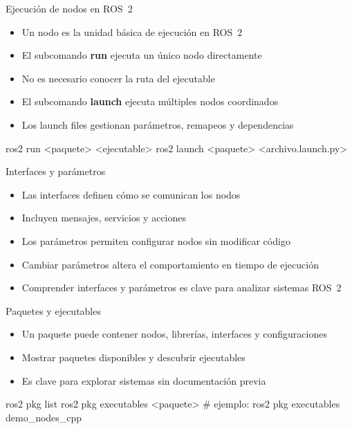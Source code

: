 \documentclass[aspectratio=169]{beamer}
\begin{document}
\begin{frame}[fragile]{Ejecución de nodos en ROS~2}
\small
\begin{itemize}
  \item Un nodo es la unidad básica de ejecución en ROS~2
  \item El subcomando \textbf{run} ejecuta un único nodo directamente
  \item No es necesario conocer la ruta del ejecutable
  \item El subcomando \textbf{launch} ejecuta múltiples nodos coordinados
  \item Los launch files gestionan parámetros, remapeos y dependencias
\end{itemize}
\vspace{2mm}
\begin{terminal}
ros2 run <paquete> <ejecutable>
ros2 launch <paquete> <archivo.launch.py>
\end{terminal}
\end{frame}

\begin{frame}{Interfaces y parámetros}
\small
\begin{itemize}
  \item Las interfaces definen cómo se comunican los nodos
  \item Incluyen mensajes, servicios y acciones
  \item Los parámetros permiten configurar nodos sin modificar código
  \item Cambiar parámetros altera el comportamiento en tiempo de ejecución
  \item Comprender interfaces y parámetros es clave para analizar sistemas ROS~2
\end{itemize}
\end{frame}

\begin{frame}[fragile]{Paquetes y ejecutables}
\small
\begin{itemize}
  \item Un paquete puede contener nodos, librerías, interfaces y configuraciones
  \item Mostrar paquetes disponibles y descubrir ejecutables
  \item Es clave para explorar sistemas sin documentación previa
\end{itemize}
\vspace{2mm}
\begin{terminal}
ros2 pkg list
ros2 pkg executables <paquete> # ejemplo: ros2 pkg executables demo_nodes_cpp
\end{terminal}
\end{frame}
\end{document}
